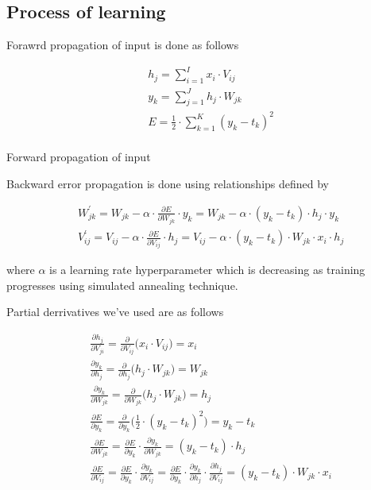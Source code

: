 \documentclass{article}
\newcommand{\SetAlgoStyle}{
	\SetAlgoNoLine
	\SetAlgoNoEnd
	\DontPrintSemicolon
}
\begin{document}
\subsection{Process of learning}

Forawrd propagation of input is done as follows

\begin{align}
	&h_j = \sum_{i=1}^I x_i \cdot V_{ij} \\
	&y_k = \sum_{j=1}^J h_j \cdot W_{jk} \\
	&E = \frac{1}{2} \cdot \sum_{k=1}^K (y_k - t_k)^2 \\	
\end{align}

\begin{algorithm}[H]
	\SetAlgoStyle
	\caption{Forward propagation of input}
\end{algorithm}

Backward error propagation is done using relationships defined by

\begin{align}
	&W_{jk}^\prime = W_{jk} - \alpha \cdot \frac{\partial E}{\partial W_{jk}}
	\cdot y_k = W_{jk} - \alpha \cdot (y_k - t_k) \cdot h_j \cdot y_k \\
	&V_{ij}^\prime = V_{ij} - \alpha \cdot \frac{\partial E}{\partial V_{ij}}
	\cdot h_j = V_{ij} - \alpha \cdot (y_k - t_k) \cdot W_{jk} \cdot x_i \cdot
	h_j
\end{align}

where $\alpha$ is a learning rate hyperparameter which is decreasing as
training progresses using simulated annealing technique.

Partial derrivatives we've used are as follows

\begin{align}
	&\frac{\partial h_j}{\partial V_{ji}} = \frac{\partial}{\partial V_{ij}}
	\Big(x_i \cdot V_{ij}\Big) = x_i \\
	&\frac{\partial y_k}{\partial h_j} = \frac{\partial}{\partial h_j}
	\Big(h_j \cdot W_{jk}\Big) = W_{jk} \\
	&\frac{\partial y_k}{\partial W_{jk}} = \frac{\partial}{\partial W_{jk}}
	\Big(h_j \cdot W_{jk}\Big) = h_j \\
	&\frac{\partial E}{\partial y_k} = \frac{\partial}{\partial y_k}
	\Big(\frac{1}{2} \cdot (y_k - t_k)^2\Big) = y_k - t_k \\
	&\frac{\partial E}{\partial W_{jk}} = \frac{\partial E}{\partial y_k} \cdot
	\frac{\partial y_k}{\partial W_{jk}} = (y_k - t_k) \cdot h_j \\
	&\frac{\partial E}{\partial V_{ij}} = \frac{\partial E}{\partial y_k} \cdot
	\frac{\partial y_k}{\partial V_{ij}} = \frac{\partial E}{\partial y_k} \cdot
	\frac{\partial y_k}{\partial h_j} \cdot \frac{\partial h_j}{\partial V_{ij}}
	= (y_k - t_k) \cdot W_{jk} \cdot x_i
\end{align}
\end{document}
